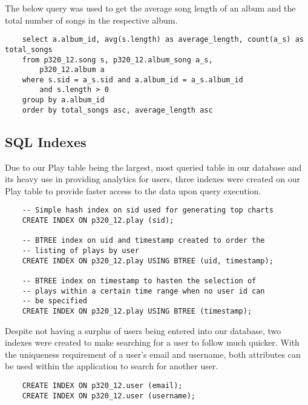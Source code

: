 \documentclass[12pt]{article}
\begin{document}
    \noindent The below query was used to get the average song length
    of an album and the total number of songs in the respective album.

    \begin{lstlisting}
    select a.album_id, avg(s.length) as average_length, count(a_s) as total_songs
    from p320_12.song s, p320_12.album_song a_s,
        p320_12.album a
    where s.sid = a_s.sid and a.album_id = a_s.album_id
        and s.length > 0
    group by a.album_id
    order by total_songs asc, average_length asc
    \end{lstlisting}







    \subsection{SQL Indexes}
    
    Due to our Play table being the largest, most queried table in
    our database and its heavy use in providing analytics for users,
    three indexes were created on our Play table to
    provide faster access to the data upon query execution.


    \begin{lstlisting}
    -- Simple hash index on sid used for generating top charts
    CREATE INDEX ON p320_12.play (sid);

    -- BTREE index on uid and timestamp created to order the
    -- listing of plays by user
    CREATE INDEX ON p320_12.play USING BTREE (uid, timestamp);

    -- BTREE index on timestamp to hasten the selection of
    -- plays within a certain time range when no user id can
    -- be specified
    CREATE INDEX ON p320_12.play USING BTREE (timestamp);
    \end{lstlisting}

    \noindent Despite not having a surplus of users being entered into our database,
    two indexes were created to make searching for a user to follow much quicker.
    With the uniqueness requirement of a user's email and username, both attributes
    can be used within the application to search for another user.
    \begin{lstlisting}
    CREATE INDEX ON p320_12.user (email);
    CREATE INDEX ON p320_12.user (username);
    \end{lstlisting}
\end{document}
